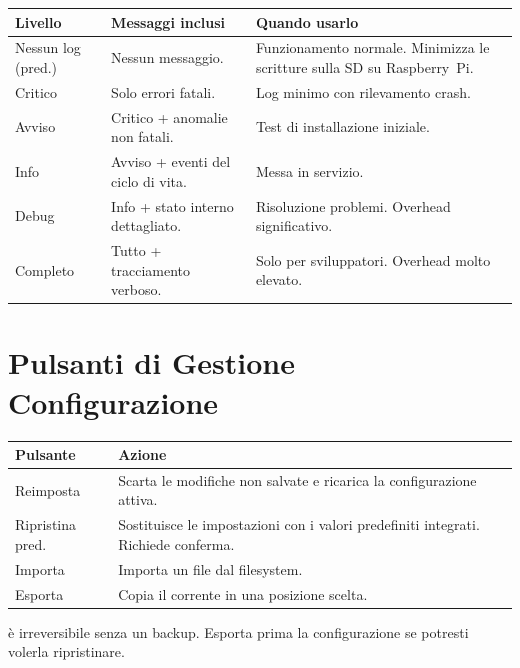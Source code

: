 \begin{longtable}{L{2.6cm}L{4.6cm}L{6.5cm}}
\toprule
{}
\color{white}\sffamily\bfseries Livello &
\color{white}\sffamily\bfseries Messaggi inclusi &
\color{white}\sffamily\bfseries Quando usarlo \\
\midrule
Nessun log (pred.) & Nessun messaggio. & Funzionamento normale. Minimizza le scritture sulla SD su Raspberry~Pi. \\
Critico       & Solo errori fatali. & Log minimo con rilevamento crash. \\
Avviso        & Critico + anomalie non fatali. & Test di installazione iniziale. \\
Info          & Avviso + eventi del ciclo di vita. & Messa in servizio. \\
Debug         & Info + stato interno dettagliato. & Risoluzione problemi. Overhead significativo. \\
Completo      & Tutto + tracciamento verboso. & Solo per sviluppatori. Overhead molto elevato. \\
\bottomrule
\end{longtable}

\section{Pulsanti di Gestione Configurazione}

\begin{longtable}{L{3.6cm}L{10.1cm}}
\toprule
{}
\color{white}\sffamily\bfseries Pulsante &
\color{white}\sffamily\bfseries Azione \\
\midrule
Reimposta         & Scarta le modifiche non salvate e ricarica la configurazione attiva. \\
Ripristina pred.  & Sostituisce le impostazioni con i valori predefiniti integrati. Richiede conferma. \\
Importa           & Importa un file  dal filesystem. \\
Esporta           & Copia il  corrente in una posizione scelta. \\
\bottomrule
\end{longtable}

\begin{warningbox}
 è irreversibile senza un backup.
Esporta prima la configurazione se potresti volerla ripristinare.
\end{warningbox}

